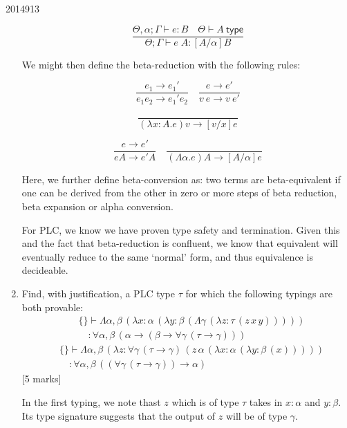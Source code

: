 \documentclass[10pt,\jkfside,a4paper]{article}
\newcommand{\answer}[1]{
    \begin{tcolorbox}[colframe=black, colback=white, sharp corners, boxrule=0.2mm, breakable]
        #1
    \end{tcolorbox}
}
\newcommand{\qmarks}[1]{\hspace*{\fill}[#1]}
\begin{document}
\begin{examquestion}{2014}{9}{13}
\begin{enumerate}
{                \[
                    \frac{\Theta, \alpha; \Gamma \vdash e : B \quad \Theta \vdash A\ \mathsf{type}}{\Theta; \Gamma \vdash e\;A : [A/\alpha]B}
                \]

                We might then define the beta-reduction with the following rules: 

                \[ 
                    \frac{e_1 \to e_1'}{e_1 e_2 \to e_1' e_2} \quad \frac{e \to e'}{v\ e \to v\ e'}
                \] 

                \[ 
                    \frac{}{(\lambda x: A. e) v \to [v / x] e}
                \] 

                \[ 
                    \frac{e \to e'}{e A \to e' A} \quad \frac{}{(\Lambda \alpha. e) A  \to [A / \alpha] e}
                \] 

                Here, we further define beta-conversion as: two terms are beta-equivalent if one can be derived from the other in zero or more steps of beta reduction, beta expansion or alpha conversion. 

                For PLC, we know we have proven type safety and termination. Given this and the fact that beta-reduction is confluent, we know that equivalent will eventually reduce to the same `normal' form, and thus equivalence is decideable. 
            }

        \item
            Find, with justification, a PLC type $\tau$ for which the following typings
            are both provable:
            \begin{align*}
                & \{\} \vdash \Lambda \alpha, \beta\, (\lambda x : \alpha\, (\lambda y : \beta\, (\Lambda \gamma\, (\lambda z : \tau\, (z\,x\,y))))) \\
                & \quad : \forall \alpha, \beta\, (\alpha \to (\beta \to \forall \gamma\, (\tau \to \gamma)))
            \end{align*}
            \begin{align*}
                & \{\} \vdash \Lambda \alpha, \beta\, (\lambda z : \forall \gamma\, (\tau \to \gamma)\, (z\,\alpha\, (\lambda x : \alpha\, (\lambda y : \beta\, (x))))) \\
                & \quad : \forall \alpha, \beta\, ((\forall \gamma\, (\tau \to \gamma)) \to \alpha)
            \end{align*}
            \qmarks{5 marks}

            \answer{
                In the first typing, we note thast $z$ which is of type $\tau$ takes in $x: \alpha$ and $y: \beta$. Its type signature suggests that the output of $z$ will be of type $\gamma$. 

}
\end{enumerate}
\end{examquestion}
\end{document}
